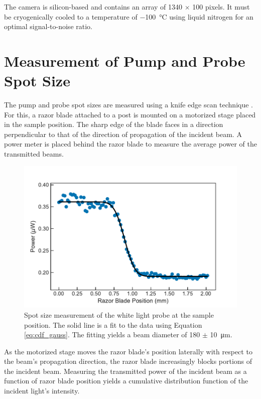 The camera is silicon-based and contains an array of 1340 $\times$ 100 pixels. It must be cryogenically cooled to a temperature of \SI{-100}{\celsius} using liquid nitrogen for an optimal signal-to-noise ratio.


\section{Measurement of Pump and Probe Spot Size}
\label{section:spot_size}
The pump and probe spot sizes are measured using a knife edge scan technique \cite{firester1977knife}. For this, a razor blade attached to a post is mounted on a motorized stage placed in the sample position. The sharp edge of the blade faces in a direction perpendicular to that of the direction of propagation of the incident beam. A power meter is placed behind the razor blade to measure the average power of the transmitted beams.

\begin{figure}[ht]
	\centering
	\includegraphics[scale=0.65]{images/chapter_methods/probe_spot_size}
	\caption{Spot size measurement of the white light probe at the sample position. The solid line is a fit to the data using Equation \ref{eq:cdf_gauss}. The fitting yields a beam diameter of 180 $\pm$ \SI{10}{\micro\meter}. }
\end{figure}


As the motorized stage moves the razor blade's position laterally with respect to the beam's propagation direction, the razor blade increasingly blocks portions of the incident beam.  Measuring the transmitted power of the incident beam as a function of razor blade position yields a cumulative distribution function of the incident light's intensity.

